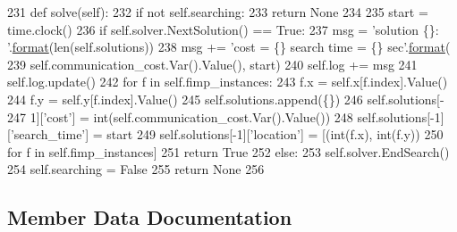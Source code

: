 \begin{DoxyCode}
231     \textcolor{keyword}{def }solve(self):
232         \textcolor{keywordflow}{if} \textcolor{keywordflow}{not} self.searching:
233             \textcolor{keywordflow}{return} \textcolor{keywordtype}{None}
234 
235         start = time.clock()
236         \textcolor{keywordflow}{if} self.solver.NextSolution() == \textcolor{keyword}{True}:
237             msg = \textcolor{stringliteral}{'solution \{\}: '}.\hyperlink{namespacesylva_1_1examples_1_1hsdfg_ab3510a0b8457362330aa4d9fd2209590}{format}(len(self.solutions))
238             msg += \textcolor{stringliteral}{'cost = \{\} search time = \{\} sec'}.\hyperlink{namespacesylva_1_1examples_1_1hsdfg_ab3510a0b8457362330aa4d9fd2209590}{format}(
239                 self.communication\_cost.Var().Value(), start)
240             self.log += msg
241             self.log.update()
242             \textcolor{keywordflow}{for} f \textcolor{keywordflow}{in} self.fimp\_instances:
243                 f.x = self.x[f.index].Value()
244                 f.y = self.y[f.index].Value()
245             self.solutions.append(\{\})
246             self.solutions[-
247                            1][\textcolor{stringliteral}{'cost'}] = int(self.communication\_cost.Var().Value())
248             self.solutions[-1][\textcolor{stringliteral}{'search\_time'}] = start
249             self.solutions[-1][\textcolor{stringliteral}{'location'}] = [(int(f.x), int(f.y))
250                                               \textcolor{keywordflow}{for} f \textcolor{keywordflow}{in} self.fimp\_instances]
251             \textcolor{keywordflow}{return} \textcolor{keyword}{True}
252         \textcolor{keywordflow}{else}:
253             self.solver.EndSearch()
254             self.searching = \textcolor{keyword}{False}
255             \textcolor{keywordflow}{return} \textcolor{keywordtype}{None}
256 
\end{DoxyCode}


\subsection{Member Data Documentation}
\mbox{\label{classsylva_1_1code__generation_1_1floorplanner_1_1floorplanner_aeb0a7c06073d6f238ca448fd31a08e75}} 
